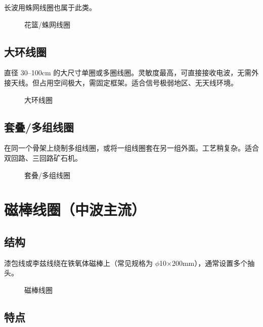 \documentclass[12pt,UTF8]{ctexbook}
\begin{document}
长波用蛛网线圈也属于此类。

\begin{figure}[H]
	\centering
	\caption{花篮/蛛网线圈}
	\label{fig:spider-coil}
\end{figure}

\subsection{大环线圈}

直径 30–100cm 的大尺寸单圈或多圈线圈。灵敏度最高，可直接接收电波，无需外接天线。但占用空间极大，需固定框架。适合信号极弱地区、无天线环境。

\begin{figure}[H]
	\centering
	\caption{大环线圈}
	\label{fig:large-loop-coil}
\end{figure}

\subsection{套叠/多组线圈}

在同一个骨架上绕制多组线圈，或将一组线圈套在另一组外面。工艺稍复杂。适合双回路、三回路矿石机。

\begin{figure}[H]
	\centering
	\caption{套叠/多组线圈}
	\label{fig:stacked-coils}
\end{figure}


\section{磁棒线圈（中波主流）}

\subsection{结构}

漆包线或李兹线绕在铁氧体磁棒上（常见规格为 $\phi$10×200mm），通常设置多个抽头。

\begin{figure}[H]
	\centering
	\caption{磁棒线圈}
	\label{fig:ferrite-rod-coil}
\end{figure}

\subsection{特点}
\end{document}
